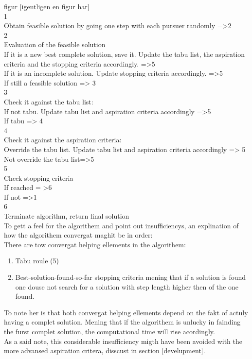 figur [igentligen en figur har]\\
1\\
Obtain feasible solution by going one step with each pursuer randomly =>2\\
2\\
Evaluation of the feasible solution\\
If it is a new best complete solution, save it. Update the tabu list, the aspiration criteria and the stopping criteria accordingly. =>5\\
If it is an incomplete solution. Update stopping criteria accordingly. =>5\\
If still a feasible solution => 3\\
3\\
Check it against the tabu list:\\
If not tabu. Update tabu list and aspiration criteria accordingly =>5\\
If tabu => 4\\
4\\
Check it against the aspiration criteria:\\
Override the tabu list. Update tabu list and aspiration criteria accordingly => 5\\
Not override the tabu list=>5\\
5\\
Check stopping criteria\\
If reached = >6 \\
If not =>1\\
6\\
Terminate algorithm, return final solution\\

To gett a feel for the algorithem and point out insufficiencys, an explination of how the algorithem convergat maghit be in order:\\
There are tow convergat helping ellements in the algorithem:
\begin{enumerate}
\item Tabu roule (5)
\item Best-solution-found-so-far stopping criteria 
\subitem mening that if a solution is found one douse not search for a solution with step length higher then of the one found.
\end{enumerate}
To note her is that both convergat helping ellements depend on the fakt of actuly having a complet solution. Mening that if the algorithem is unlucky in fainding the furst complet solution, the computational time will rise acordingly.\\
As a said note, this considerable insufficiency migth have been avoided with the more advansed aspiration critera, disscust in section [develupment].




